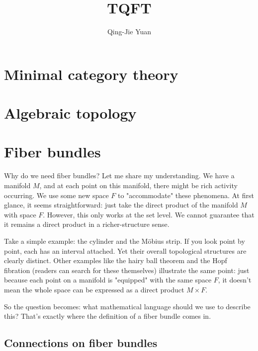 \documentclass[a4paper,11pt]{article}
\title{TQFT}
\author{Qing-Jie Yuan}
\date{ }
\begin{document}
\maketitle
\tableofcontents

\section{Minimal category theory}

\section{Algebraic topology}
\section{Fiber bundles}
Why do we need fiber bundles? Let me share my understanding. 
We have a manifold $M$, and at each point on this manifold, there might be rich activity occurring. 
We use some new space $F$  to "accommodate" these phenomena. At first glance, it seems straightforward: 
just take the direct product of the manifold $M$ with space $F$. However, this only works at the set level. 
We cannot guarantee that it remains a direct product in a richer-structure sense.\par
Take a simple example: the cylinder and the Möbius strip. 
If you look point by point, each has an interval attached. 
Yet their overall topological structures are clearly distinct. 
Other examples like the hairy ball theorem and the Hopf fibration (readers can search for these themselves) illustrate the same point: 
just because each point on a manifold is "equipped" with the same space $F$, it doesn't mean the whole space can be expressed as a direct product $M\times F$.\par
So the question becomes: what mathematical language should we use to describe this?  
That's exactly where the definition of a fiber bundle comes in.

\subsection{Connections on fiber bundles}
\end{document}
